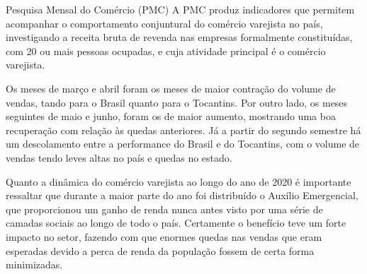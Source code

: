 \begin{smbox}[label={labelbox},nameref={Pesquisa Mensal do Comércio(PMC)}]{Pesquisa Mensal do Comércio (PMC)}
A PMC produz indicadores que permitem acompanhar o comportamento conjuntural do comércio varejista no país, investigando a receita bruta de revenda nas empresas formalmente constituídas, com 20 ou mais pessoas ocupadas, e cuja atividade principal é o comércio varejista.
\end{smbox}

\par Os meses de março e abril foram os meses de maior contração do volume de vendas, tando para o Brasil quanto para o Tocantins. Por outro lado, os meses seguintes de maio e junho, foram os de maior aumento, mostrando uma boa recuperação com relação às quedas anteriores. Já a partir do segundo semestre há um descolamento entre a performance do Brasil e do Tocantins, com o volume de vendas tendo leves altas no país e quedas no estado.
\par Quanto a dinâmica do comércio varejista ao longo do ano de 2020 é importante ressaltar que durante a maior parte do ano foi distribuído o Auxílio Emergencial, que proporcionou um ganho de renda nunca antes visto por uma série de camadas sociais ao longo de todo o país. Certamente o benefício teve um forte impacto no setor, fazendo com que enormes quedas nas vendas que eram esperadas devido a perca de renda da população fossem de certa forma minimizadas.
